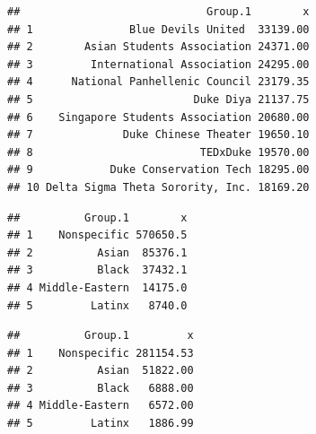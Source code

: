 \documentclass[]{article}
\newenvironment{Shaded}{\begin{snugshade}}{\end{snugshade}}
\newcommand{\DataTypeTok}[1]{\textcolor[rgb]{0.13,0.29,0.53}{#1}}
\newcommand{\DecValTok}[1]{\textcolor[rgb]{0.00,0.00,0.81}{#1}}
\newcommand{\KeywordTok}[1]{\textcolor[rgb]{0.13,0.29,0.53}{\textbf{#1}}}
\newcommand{\NormalTok}[1]{#1}
\newcommand{\OperatorTok}[1]{\textcolor[rgb]{0.81,0.36,0.00}{\textbf{#1}}}
\newcommand{\OtherTok}[1]{\textcolor[rgb]{0.56,0.35,0.01}{#1}}
\newcommand{\StringTok}[1]{\textcolor[rgb]{0.31,0.60,0.02}{#1}}
\begin{document}
\begin{verbatim}
##                             Group.1        x
## 1               Blue Devils United  33139.00
## 2        Asian Students Association 24371.00
## 3         International Association 24295.00
## 4      National Panhellenic Council 23179.35
## 5                         Duke Diya 21137.75
## 6    Singapore Students Association 20680.00
## 7              Duke Chinese Theater 19650.10
## 8                          TEDxDuke 19570.00
## 9            Duke Conservation Tech 18295.00
## 10 Delta Sigma Theta Sorority, Inc. 18169.20
\end{verbatim}

\begin{Shaded}
\end{Shaded}

\begin{verbatim}
##          Group.1        x
## 1    Nonspecific 570650.5
## 2          Asian  85376.1
## 3          Black  37432.1
## 4 Middle-Eastern  14175.0
## 5         Latinx   8740.0
\end{verbatim}

\begin{Shaded}
\end{Shaded}

\begin{verbatim}
##          Group.1         x
## 1    Nonspecific 281154.53
## 2          Asian  51822.00
## 3          Black   6888.00
## 4 Middle-Eastern   6572.00
## 5         Latinx   1886.99
\end{verbatim}

\begin{Shaded}
\end{Shaded}
\end{document}
